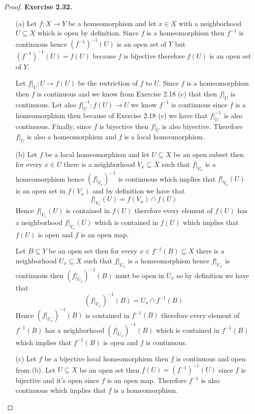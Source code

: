 \documentclass[11pt]{article}
\theoremstyle{definition}
\begin{document}
\begin{proof}{\textbf{Exercise 2.32.}}
\begin{itemize}
    \item [(a)] Let $f: X \to Y$ be a homeomorphism and let
    $x \in X$ with a neighborhood $U \subseteq X$ which is open by definition.
    Since $f$ is a homeomorphism then $f^{-1}$ is continuous hence
    $(f^{-1})^{-1}(U)$ is an open set of $Y$ but $(f^{-1})^{-1}(U) = f(U)$
    because $f$ is bijective therefore $f(U)$ is an open set of $Y$.

    Let $f|_U: U \to f(U)$ be the restriction of $f$ to $U$. Since $f$ is a
    homeomorphism then $f$ is continuous and we know from Exercise 2.18 (c)
    that then $f|_U$ is continuous. Let also $f|_U^{-1}:f(U) \to U$ we know
    $f^{-1}$ is continuous since $f$ is a homeomorphism then because of
    Exercise 2.18 (c) we have that $f|_U^{-1}$ is also continuous.
    Finally, since $f$ is biyective then $f|_U$ is also biyective.
    Therefore $f|_U$ is also a homeomorphism and $f$ is a local homeomorphism.

    \item [(b)] Let $f$ be a local homeomorphism and let $U \subseteq X$ be an
    open subset then for every $x \in U$ there is a neighborhood
    $V_x \subseteq X$ such that $f|_{V_x}$ is a homeomorphism hence
    $(f|_{V_x})^{-1}$ is continuous which implies that $f|_{V_x}(U)$ is an open
    set in $f(V_x)$ and by definition we have that
    $$f|_{V_x}(U) = f(V_x) \cap f(U)$$
    Hence $f|_{V_x}(U)$ is contained in $f(U)$ therefore every
    element of $f(U)$ has a neighborhood $f|_{V_x}(U)$ which is
    contained in $f(U)$ which implies that $f(U)$ is open and $f$
    is an open map.

    Let $B \subseteq Y$ be an open set then for every
    $x \in f^{-1}(B) \subseteq X$ there is a neighborhood $U_x \subseteq X$
    such that $f|_{U_x}$ is a homeomorphism hence $f|_{U_x}$ is continuous
    then $(f|_{U_x})^{-1}(B)$ must be open in $U_x$ so by definition we have that
    $$(f|_{U_x})^{-1}(B) = U_x \cap f^{-1}(B)$$
    Hence $(f|_{U_x})^{-1}(B)$ is contained in $f^{-1}(B)$ therefore every
    element of $f^{-1}(B)$ has a neighborhood $(f|_{U_x})^{-1}(B)$ which is
    contained in $f^{-1}(B)$ which implies that $f^{-1}(B)$ is open and $f$
    is continuous.

    \item [(c)] Let $f$ be a bijective local homeomorphism then $f$ is
    continuous and open from (b). Let $U \subseteq X$ be an open set then
    $f(U) = (f^{-1})^{-1}(U)$ since $f$ is bijective and it's open since $f$
    is an open map. Therefore $f^{-1}$ is also continuous which implies that
    $f$ is a homeomorphism.
\end{itemize}
\end{proof}
\end{document}
